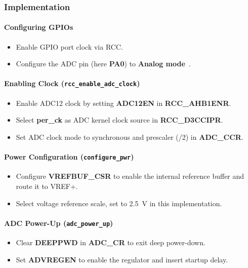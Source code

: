 \documentclass[12pt,a4paper]{article}
\begin{document}
\subsubsection{Implementation}

\paragraph{Configuring GPIOs}
\begin{itemize}
    \item Enable GPIO port clock via RCC.
    \item Configure the ADC pin (here \textbf{PA0}) to \textbf{Analog mode}~\cite[pp.~88]{ref-manual}.
\end{itemize}

\paragraph{Enabling Clock (\texttt{rcc\_enable\_adc\_clock})}
\begin{itemize}
    \item Enable ADC12 clock by setting \textbf{ADC12EN} in \textbf{RCC\_AHB1ENR}.
    \item Select \textbf{per\_ck} as ADC kernel clock source in \textbf{RCC\_D3CCIPR}.
    \item Set ADC clock mode to synchronous and prescaler (/2) in \textbf{ADC\_CCR}.
\end{itemize}

\paragraph{Power Configuration (\texttt{configure\_pwr})}
\begin{itemize}
    \item Configure \textbf{VREFBUF\_CSR} to enable the internal reference buffer and route it to VREF+.
    \item Select voltage reference scale, set  to \SI{2.5}{\volt} in this implementation.
\end{itemize}

\paragraph{ADC Power-Up (\texttt{adc\_power\_up})}
\begin{itemize}
    \item Clear \textbf{DEEPPWD} in \textbf{ADC\_CR} to exit deep power-down.
    \item Set \textbf{ADVREGEN} to enable the regulator and insert startup delay.
\end{itemize}
\end{document}

